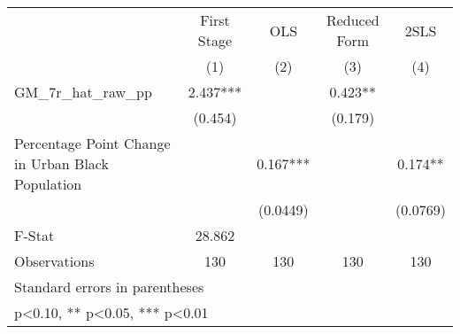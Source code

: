 {
\def\sym#1{\ifmmode^{#1}\else\(^{#1}\)\fi}
\begin{tabular}{l*{4}{c}}
\toprule
                    & First Stage   &         OLS   &Reduced Form   &        2SLS   \\
                    &\multicolumn{1}{c}{(1)}   &\multicolumn{1}{c}{(2)}   &\multicolumn{1}{c}{(3)}   &\multicolumn{1}{c}{(4)}   \\
\midrule
GM\_7r\_hat\_raw\_pp    &       2.437***&               &       0.423** &               \\
                    &     (0.454)   &               &     (0.179)   &               \\
\addlinespace
Percentage Point Change in Urban Black Population&               &       0.167***&               &       0.174** \\
                    &               &    (0.0449)   &               &    (0.0769)   \\
\midrule
F-Stat              &      28.862   &               &               &               \\
Observations        &         130   &         130   &         130   &         130   \\
\bottomrule
\multicolumn{5}{l}{\footnotesize Standard errors in parentheses}\\
\multicolumn{5}{l}{\footnotesize * p<0.10, ** p<0.05, *** p<0.01}\\
\end{tabular}
}

